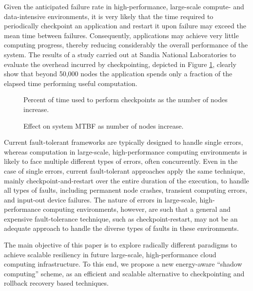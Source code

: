 Given the anticipated failure rate in high-performance, large-scale
compute- and data-intensive environments, it is very likely that the
time required to periodically checkpoint an application and restart it
upon failure may exceed the mean time between failures.  Consequently,
applications may achieve very little computing progress, thereby
reducing considerably the overall performance of the system.  The
results of a study carried out at Sandia National Laboratories to
evaluate the overhead incurred by checkpointing, depicted in
Figure \ref{sandia_percent_of_time}, clearly show that beyond 50,000
nodes the application spends only a fraction of the elapsed time
performing useful computation.

\begin{figure}[hHtb]
\centering
{}
\caption { Percent of time used to perform checkpoints as the number of nodes increase. }
\label{sandia_percent_of_time}
\end{figure}

\begin{figure}[hHtb]
\centering
{}
\caption { Effect on system MTBF as number of nodes increase. }
\label{sandia_system_mtbf}
\end{figure}

Current fault-tolerant frameworks are typically designed to handle
single errors, whereas computation in large-scale, high-performance
computing environments is likely to face multiple different types of
errors, often concurrently. Even in the case of single errors, current
fault-tolerant approaches apply the same technique, mainly
checkpoint-and-restart over the entire duration of the execution, to
handle all types of faults, including permanent node crashes,
transient computing errors, and input-out device failures. The nature
of errors in large-scale, high-performance computing environments,
however, are such that a general and expensive fault-tolerance
technique, such as checkpoint-restart, may not be an adequate approach
to handle the diverse types of faults in these environments.

The main objective of this paper is to explore radically different
paradigms to achieve scalable resiliency in future large-scale,
high-performance cloud computing infrastructure. To this end, we
propose a new energy-aware ``shadow computing'' scheme, as an efficient
and scalable alternative to checkpointing and rollback recovery based
techniques.

